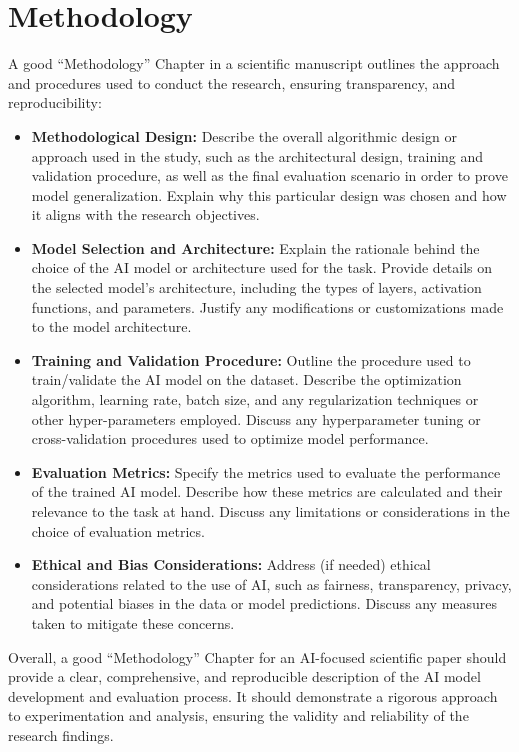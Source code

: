 \documentclass{article}
\begin{document}
\section{Methodology}
A good ``Methodology'' Chapter in a scientific manuscript outlines the approach and procedures used to conduct the research, ensuring transparency, and reproducibility:

\begin{itemize}
\item \textbf{Methodological Design:} Describe the overall algorithmic design or approach used in the study, such as the architectural design, training and validation procedure, as well as the final evaluation scenario in order to prove model generalization. Explain why this particular design was chosen and how it aligns with the research objectives.
\item \textbf{Model Selection and Architecture:} Explain the rationale behind the choice of the AI model or architecture used for the task. Provide details on the selected model's architecture, including the types of layers, activation functions, and parameters. Justify any modifications or customizations made to the model architecture.
\item \textbf{Training and Validation Procedure:} Outline the procedure used to train/validate the AI model on the dataset. Describe the optimization algorithm, learning rate, batch size, and any regularization techniques or other hyper-parameters employed. Discuss any hyperparameter tuning or cross-validation procedures used to optimize model performance.
\item \textbf{Evaluation Metrics:} Specify the metrics used to evaluate the performance of the trained AI model. Describe how these metrics are calculated and their relevance to the task at hand. Discuss any limitations or considerations in the choice of evaluation metrics.
\item \textbf{Ethical and Bias Considerations:} Address (if needed) ethical considerations related to the use of AI, such as fairness, transparency, privacy, and potential biases in the data or model predictions. Discuss any measures taken to mitigate these concerns.
\end{itemize}

Overall, a good ``Methodology'' Chapter for an AI-focused scientific paper should provide a clear, comprehensive, and reproducible description of the AI model development and evaluation process. It should demonstrate a rigorous approach to experimentation and analysis, ensuring the validity and reliability of the research findings.
\end{document}
